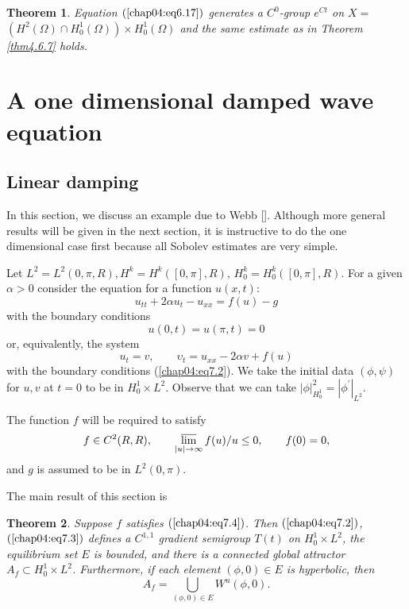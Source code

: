 \documentclass{surv-l}
\theoremstyle{plain}
\newtheorem{theorem}{Theorem}[section]
\theoremstyle{definition}
\numberwithin{equation}{section}
\numberwithin{figure}{chapter}
\begin{document}
\begin{theorem}\label{thm4.6.8} Equation $(\ref{chap04:eq6.17})$ generates a $C^{0}$-group $e^{Ct}$ on $X =$
$(H^{2}(\Omega)\cap H_{0}^{1}(\Omega))\times H_{0}^{1}(\Omega)$ and the same estimate as in Theorem \ref{thm4.6.7} holds.
\end{theorem}

\section{A one dimensional damped wave equation}\label{sec4.7}

\subsection{Linear damping}\label{subsec4.7.1} In this section, we discuss an example due to Webb [\citeyear{1979wb}]. Although more general results will be given in the next section, it is instructive to do the one dimensional case first because all Sobolev estimates are very simple.

Let $L^{2}=L^{2}(0, \pi, R), H^{k}=H^{k}([0, \pi], R),\, H_{0}^{k}=H_{0}^{k}([0, \pi], R)$. For a given $\alpha>0$ consider the equation for a function $u(x, t)$:
\begin{equation}\label{chap04:eq7.1}
u_{tt}+2\alpha u_{t}-u_{xx}=f(u)-g
\end{equation}
with the boundary conditions
\begin{equation}\label{chap04:eq7.2}
u(0, t)=u(\pi, t)=0
\end{equation}
or, equivalently, the system
\begin{equation}\label{chap04:eq7.3}
u_{t}=v,\qquad \upsilon_{t}=u_{xx}-2\alpha v +f(u)
\end{equation}
with the boundary conditions (\ref{chap04:eq7.2}). We take the initial data $(\phi, \psi)$ for $u, v$ at $t=0$ to be in $H_{0}^{1} \times L^{2}$. Observe that we can take $|\phi|_{H_{0}^{1}}^{2}=|\phi^{\prime}|_{L^{2}}$.

The function $f$ will be required to satisfy
\begin{equation}\label{chap04:eq7.4}
f\in C^{2}(R, R),\qquad \varlimsup_{|u|\rightarrow\infty}f(u)/u\leq 0,\qquad f(0)=0,
\end{equation}
and $g$ is assumed to be in $L^{2}(0, \pi)$.

The main result of this section is

\begin{theorem}\label{thm4.7.1} Suppose $f$ satisfies $(\ref{chap04:eq7.4})$. Then $(\ref{chap04:eq7.2})$, $(\ref{chap04:eq7.3})$ defines a $C^{1,1}$ gradient semigroup $T(t)$ on $H_{0}^{1}\times L^{2}$, the equilibrium set $E$ is bounded, and there is a connected global attractor $A_{f}\subset H_{0}^{1}\times L^{2}$. Furthermore, if each element $(\phi, 0)\in E$ is hyperbolic, then
\begin{equation*}
A_{f}=\bigcup_{(\phi,0)\in E}W^{u}(\phi, 0).
\end{equation*}
\end{theorem}
\end{document}
